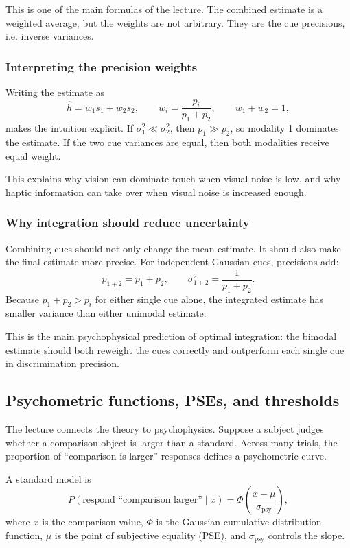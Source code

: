 This is one of the main formulas of the lecture. The combined estimate is a weighted average, but the weights are not arbitrary. They are the cue precisions, i.e. inverse variances.

\subsubsection{Interpreting the precision weights}

Writing the estimate as
\[
\hat h = w_1 s_1 + w_2 s_2,
\qquad
w_i=\frac{p_i}{p_1+p_2},
\qquad
w_1+w_2=1,
\]
makes the intuition explicit. If \(\sigma_1^2\ll\sigma_2^2\), then \(p_1\gg p_2\), so modality 1 dominates the estimate. If the two cue variances are equal, then both modalities receive equal weight.

This explains why vision can dominate touch when visual noise is low, and why haptic information can take over when visual noise is increased enough.

\subsubsection{Why integration should reduce uncertainty}

Combining cues should not only change the mean estimate. It should also make the final estimate more precise. For independent Gaussian cues, precisions add:
\[
p_{1+2}=p_1+p_2,
\qquad
\sigma_{1+2}^2=\frac{1}{p_1+p_2}.
\]
Because \(p_1+p_2>p_i\) for either single cue alone, the integrated estimate has smaller variance than either unimodal estimate.

This is the main psychophysical prediction of optimal integration: the bimodal estimate should both reweight the cues correctly and outperform each single cue in discrimination precision.

\subsection{Psychometric functions, PSEs, and thresholds}

The lecture connects the theory to psychophysics. Suppose a subject judges whether a comparison object is larger than a standard. Across many trials, the proportion of ``comparison is larger'' responses defines a psychometric curve.

A standard model is
\[
P(\text{respond ``comparison larger''}\mid x)
=
\Phi\left(\frac{x-\mu}{\sigma_{\mathrm{psy}}}\right),
\]
where \(x\) is the comparison value, \(\Phi\) is the Gaussian cumulative distribution function, \(\mu\) is the point of subjective equality (PSE), and \(\sigma_{\mathrm{psy}}\) controls the slope.

